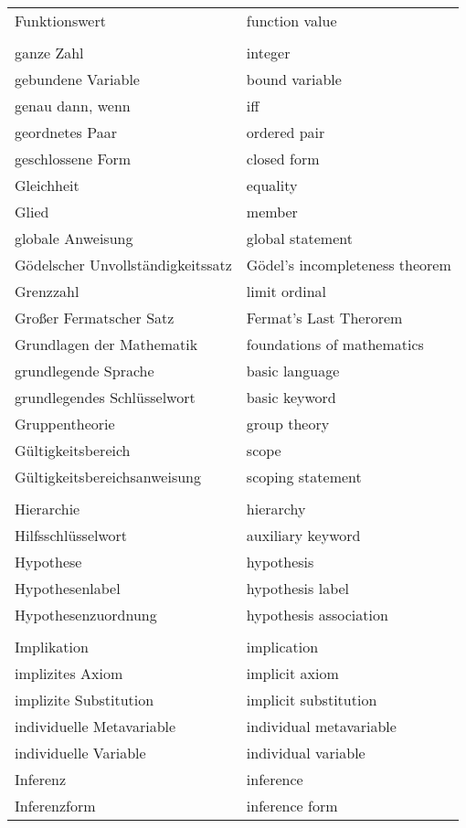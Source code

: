 \begin{longtabu}   { @{} X[l] X[l] }
    Funktionswert & function value \\
     & \\
    ganze Zahl & integer \\
    gebundene Variable & bound variable \\
    genau dann, wenn & iff \\
    geordnetes Paar & ordered pair \\
    geschlossene Form & closed form \\
    Gleichheit & equality \\
    Glied & member \\
    globale Anweisung & global statement \\
    Gödelscher Unvollständigkeitssatz & Gödel's incompleteness theorem \\
    Grenzzahl & limit ordinal \\
    Großer Fermatscher Satz & Fermat's Last Therorem \\
    Grundlagen der Mathematik & foundations of mathematics \\
    grundlegende Sprache & basic language \\
    grundlegendes Schlüsselwort & basic keyword \\
    Gruppentheorie & group theory \\
    Gültigkeitsbereich & scope \\
    Gültigkeitsbereichsanweisung & scoping statement \\
     & \\
    Hierarchie & hierarchy \\
    Hilfsschlüsselwort & auxiliary keyword \\
    Hypothese & hypothesis \\
    Hypothesenlabel & hypothesis label \\
    Hypothesenzuordnung & hypothesis association \\
     & \\
    Implikation & implication \\
    implizites Axiom & implicit axiom \\
    implizite Substitution & implicit substitution \\
    individuelle Metavariable & individual metavariable \\
    individuelle Variable & individual variable \\
    Inferenz & inference \\
    Inferenzform & inference form \\

\end{longtabu}
